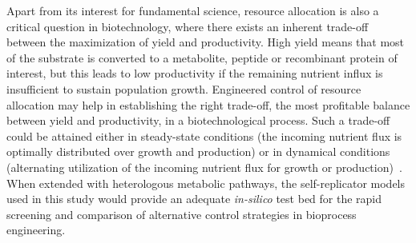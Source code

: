 Apart from its interest for fundamental science, resource allocation is also a critical question in biotechnology, where there exists an inherent trade-off between the maximization of yield and productivity\cite{venayak_engineering_2015}.
High yield means that most of the substrate is converted to a metabolite, peptide or recombinant protein of interest, but this leads to low productivity if the remaining nutrient influx is insufficient to sustain population growth.
Engineered control of resource allocation may help in establishing the right trade-off, the most profitable balance between yield and productivity, in a biotechnological process.
Such a trade-off could be attained either in steady-state conditions (the incoming nutrient flux is optimally distributed over growth and production) or in dynamical conditions (alternating utilization of the incoming nutrient flux for growth or production)~\cite{dahl_engineering_2013,xu_improving_2014,izard_synthetic_2015}.
When extended with heterologous metabolic pathways, the self-replicator models used in this study would provide an adequate \textit{in-silico} test bed for the rapid screening and comparison of alternative control strategies in bioprocess engineering.
